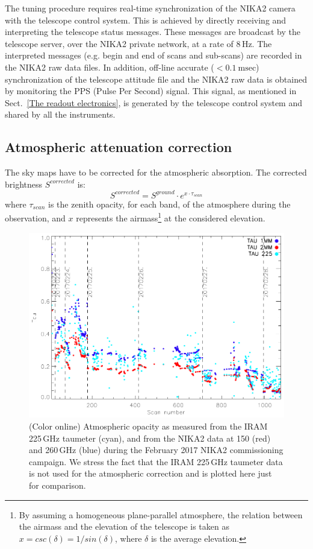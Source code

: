\documentclass[]{aa} %
\begin{document}
The tuning procedure requires real-time synchronization of the NIKA2 camera with the telescope control system. This is achieved by directly receiving and interpreting the telescope status messages. These messages are broadcast by the telescope server, over the NIKA2 private network, at a rate of 8\,Hz. The interpreted messages (e.g. begin and end of scans and sub-scans) are recorded in the NIKA2 raw data files. In addition, off-line accurate ($< 0.1~ \textrm{msec}$) synchronization of the telescope attitude file and the NIKA2 raw data is obtained by monitoring the PPS (Pulse Per Second) signal. This signal, as mentioned in Sect.~\ref{The readout electronics}, is generated by the telescope control system and shared by all the instruments.


\subsection{Atmospheric attenuation correction}
\label{Atmospheric attenuation correction}


The sky maps have to be corrected for the atmospheric absorption. The corrected brightness $S^{corrected}$ is:
\begin{equation}\label{eq:opa}
S^{corrected} =  S^{ground} \cdot e^{ x \cdot \tau_{scan}}
\end{equation}
where $\tau_{scan}$ is the zenith opacity, for each band, of the atmosphere during the
observation, and $x$ represents the airmass\footnote{By assuming a
  homogeneous plane-parallel atmosphere, the relation between the
  airmass and the elevation of the telescope is taken as $x =
  csc(\delta)=1/sin(\delta)$, where $\delta$ is the average
  elevation.} at the considered elevation.

\begin{figure}
\includegraphics[scale=0.55]{./opacity_evol_run22.pdf}
\caption{(Color online) Atmospheric opacity as measured from the IRAM 225\,GHz taumeter (cyan), and from the NIKA2 data at 150 (red) and 260\,GHz (blue) during the February 2017 NIKA2 commissioning campaign. We stress the fact that the IRAM 225\,GHz taumeter data is not used for the atmospheric correction and is plotted here just for comparison.
  \label{fig:taumeas}}
\end{figure}
\end{document}
